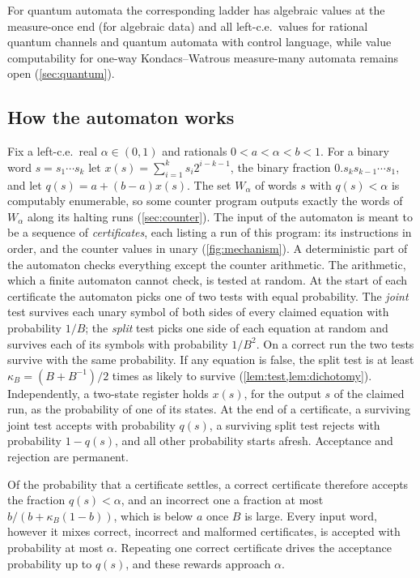 \documentclass[11pt]{article}
\theoremstyle{plain}
\theoremstyle{definition}
\theoremstyle{remark}
\begin{document}
For quantum automata the corresponding ladder has algebraic values at the measure-once end (for algebraic data) and all left-c.e.\ values for rational quantum channels and quantum automata with control language, while value computability for one-way Kondacs--Watrous measure-many automata remains open (\cref{sec:quantum}).
\subsection{How the automaton works}

Fix a left-c.e.\ real $\alpha\in(0,1)$ and rationals $0<a<\alpha<b<1$. For a binary word $s=s_1\cdots s_k$ let $x(s)=\sum_{i=1}^k s_i2^{i-k-1}$, the binary fraction $0.s_ks_{k-1}\cdots s_1$, and let $q(s)=a+(b-a)x(s)$. The set $W_\alpha$ of words $s$ with $q(s)<\alpha$ is computably enumerable, so some counter program outputs exactly the words of $W_\alpha$ along its halting runs (\cref{sec:counter}). The input of the automaton is meant to be a sequence of \emph{certificates}, each listing a run of this program: its instructions in order, and the counter values in unary (\cref{fig:mechanism}). A deterministic part of the automaton checks everything except the counter arithmetic. The arithmetic, which a finite automaton cannot check, is tested at random. At the start of each certificate the automaton picks one of two tests with equal probability. The \emph{joint} test survives each unary symbol of both sides of every claimed equation with probability $1/B$; the \emph{split} test picks one side of each equation at random and survives each of its symbols with probability $1/B^2$. On a correct run the two tests survive with the same probability. If any equation is false, the split test is at least $\kappa_B=(B+B^{-1})/2$ times as likely to survive (\cref{lem:test,lem:dichotomy}). Independently, a two-state register holds $x(s)$, for the output $s$ of the claimed run, as the probability of one of its states. At the end of a certificate, a surviving joint test accepts with probability $q(s)$, a surviving split test rejects with probability $1-q(s)$, and all other probability starts afresh. Acceptance and rejection are permanent.

Of the probability that a certificate settles, a correct certificate therefore accepts the fraction $q(s)<\alpha$, and an incorrect one a fraction at most $b/(b+\kappa_B(1-b))$, which is below $a$ once $B$ is large. Every input word, however it mixes correct, incorrect and malformed certificates, is accepted with probability at most $\alpha$. Repeating one correct certificate drives the acceptance probability up to $q(s)$, and these rewards approach $\alpha$.
\end{document}
